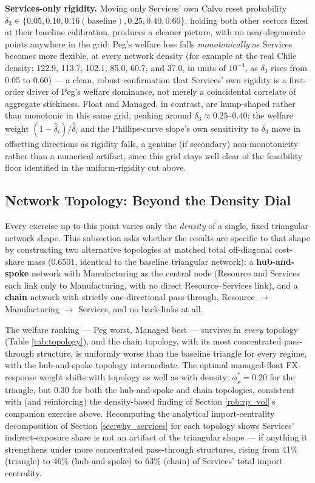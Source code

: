 \documentclass[12pt]{article}
\begin{document}
\textbf{Services-only rigidity.} Moving only Services' own Calvo reset probability
$\delta_3\in\{0.05,0.10,0.16(\text{baseline}),0.25,0.40,0.60\}$, holding both other sectors fixed at
their baseline calibration, produces a cleaner picture, with no near-degenerate points anywhere in the
grid: Peg's welfare loss falls \emph{monotonically} as Services becomes more flexible, at every
network density (for example at the real Chile density: 122.9, 113.7, 102.1, 85.0, 60.7, and 37.0, in
units of $10^{-4}$, as $\delta_3$ rises from 0.05 to 0.60) --- a clean, robust confirmation that
Services' own rigidity is a first-order driver of Peg's welfare dominance, not merely a coincidental
correlate of aggregate stickiness. Float and Managed, in contrast, are hump-shaped rather than
monotonic in this same grid, peaking around $\delta_3\approx0.25$--$0.40$: the welfare weight
$(1-\hat\delta_i)/\hat\delta_i$ and the Phillips-curve slope's own sensitivity to $\delta_3$ move in
offsetting directions as rigidity falls, a genuine (if secondary) non-monotonicity rather than a
numerical artifact, since this grid stays well clear of the feasibility floor identified in the
uniform-rigidity cut above.

\subsection{Network Topology: Beyond the Density Dial}
\label{rob:topology}

Every exercise up to this point varies only the \emph{density} of a single, fixed triangular network
shape. This subsection asks whether the results are specific to that shape by constructing two
alternative topologies at matched total off-diagonal cost-share mass (0.6501, identical to the
baseline triangular network): a \textbf{hub-and-spoke} network with Manufacturing as the central node
(Resource and Services each link only to Manufacturing, with no direct Resource--Services link), and a
\textbf{chain} network with strictly one-directional pass-through, Resource $\to$ Manufacturing $\to$
Services, and no back-links at all.

The welfare ranking --- Peg worst, Managed best --- survives in \emph{every} topology (Table
\ref{tab:topology}), and the chain topology, with its most concentrated pass-through structure, is
uniformly worse than the baseline triangle for every regime, with the hub-and-spoke topology
intermediate. The optimal managed-float FX-response weight shifts with topology as well as with
density: $\phi_s^*=0.20$ for the triangle, but $0.30$ for both the hub-and-spoke and chain topologies,
consistent with (and reinforcing) the density-based finding of Section \ref{rob:rp_vol}'s companion
exercise above. Recomputing the analytical import-centrality decomposition of Section
\ref{sec:why_services} for each topology shows Services' indirect-exposure share is not an artifact of
the triangular shape --- if anything it strengthens under more concentrated pass-through structures,
rising from 41\% (triangle) to 46\% (hub-and-spoke) to 63\% (chain) of Services' total import
centrality.
\end{document}
